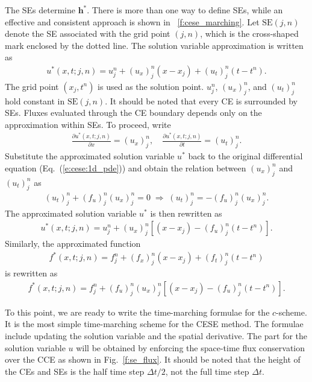\documentclass{turgon}
\begin{document}
The SEs determine $\mathbf{h}^*$.  There is more than one way to define SEs,
while an effective and consistent approach is shown in
\figurename~\ref{f:cese_marching}.  Let $\mathrm{SE}(j,n)$ denote the SE
associated with the grid point $(j,n)$, which is the cross-shaped mark enclosed
by the dotted line.  The solution variable approximation is written as
\begin{align*}
  u^*(x,t;j,n) = u_j^n + (u_x)_j^n(x-x_j) + (u_t)_j^n(t-t^n) .
\end{align*}
The grid point $(x_j, t^n)$ is used as the solution point.  $u_j^n$,
$(u_x)_j^n$, and $(u_t)_j^n$ hold constant in $\mathrm{SE}(j,n)$.  It should be
noted that every CE is surrounded by SEs.  Fluxes evaluated through the CE
boundary depends only on the approximation within SEs.  To proceed, write
\begin{align*}
  \frac{\partial u^*(x,t;j,n)}{\partial x} = (u_x)_j^n, \quad
  \frac{\partial u^*(x,t;j,n)}{\partial t} = (u_t)_j^n .
\end{align*}
Substitute the approximated solution variable $u^*$ back to the original
differential equation (Eq.~(\ref{e:cese:1d_pde})) and obtain the relation
between $(u_x)_j^n$ and $(u_t)_j^n$ as
\begin{align*}
                  (u_t)_j^n + (f_u)_j^n(u_x)_j^n = 0
  \;\Rightarrow\; (u_t)_j^n = -(f_u)_j^n(u_x)_j^n .
\end{align*}
The approximated solution variable $u^*$ is then rewritten as
\begin{align*}
  u^*(x,t;j,n) = u_j^n + (u_x)_j^n\left[(x-x_j) - (f_u)_j^n(t-t^n)\right] .
\end{align*}
Similarly, the approximated function
\begin{align*}
  f^*(x,t;j,n) = f_j^n + (f_x)_j^n(x-x_j) + (f_t)_j^n(t-t^n)
\end{align*}
is rewritten as
\begin{align*}
  f^*(x,t;j,n) = f_j^n + (f_u)_j^n (u_x)_j^n \left[
    (x-x_j) - (f_u)_j^n(t-t^n)
  \right] .
\end{align*}

To this point, we are ready to write the time-marching formulae for the
$c$-scheme.  It is the most simple time-marching scheme for the CESE method.
The formulae include updating the solution variable and the spatial derivative.
The part for the solution variable $u$ will be obtained by enforcing the
space-time flux conservation over the CCE as shown in Fig.~\ref{f:se_flux}.  It
should be noted that the height of the CEs and SEs is the half time step
$\Delta t/2$, not the full time step $\Delta t$.
\end{document}
